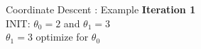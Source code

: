 \documentclass{beamer}
\begin{document}
\begin{frame}{Coordinate Descent : Example}
\textbf{Iteration 1}\\
\vspace{0.5cm}
INIT: $\theta_{0} = 2$ and  $\theta_{1}  = 3$\\

\vspace{0.5cm}
$\theta_1 = 3$ optimize for $\theta_{0}$\\ 


\end{frame}
\end{document}
